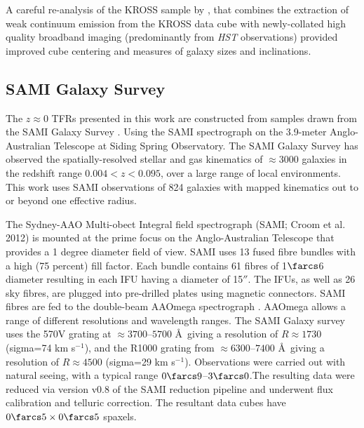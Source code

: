 \documentclass[a4paper,fleqn,usenatbib]{mnras}
\begin{document}
A careful re-analysis of the KROSS sample by \citet{Harrison:2017}, that combines the extraction of weak continuum emission from the KROSS data cube with newly-collated high quality broadband imaging (predominantly from {\it HST} observations) provided improved cube centering and measures of galaxy sizes and inclinations. 

\subsection{SAMI Galaxy Survey}
\label{subsec:SAMIHQ}

The $z\approx0$ TFRs presented in this work are constructed from samples drawn from the SAMI Galaxy Survey  \citep{Bryant:2015}. Using the SAMI spectrograph \citep{Croom:2012} on the 3.9-meter Anglo-Australian Telescope at Siding Spring Observatory. The SAMI Galaxy Survey has observed the spatially-resolved stellar and gas kinematics of $\approx3000$ galaxies in the redshift range $0.004 < z <0.095$, over a large range of local environments. This work uses SAMI observations of 824 galaxies with mapped kinematics out to or beyond one effective radius. 

The Sydney-AAO Multi-obect Integral field spectrograph (SAMI; Croom et al. 2012) is mounted at the prime focus on the Anglo-Australian Telescope that provides a 1 degree diameter field of view. SAMI uses 13 fused fibre bundles \citep[Hexabundles,][]{BlandHawthorn:2011,Bryant:2014} with a high (75 percent) fill factor. Each bundle contains 61 fibres of 1$\farcs$6 diameter resulting in each IFU having a diameter of 15$''$. The IFUs, as well as 26 sky fibres, are plugged into pre-drilled plates using magnetic connectors. SAMI fibres are fed to the double-beam AAOmega spectrograph \citep{Sharp:2015}. AAOmega allows a range of different resolutions and wavelength ranges. The SAMI Galaxy survey uses the 570V grating at $\approx3700$--$5700$ \AA\ giving a resolution of $R\approx1730$ (sigma=74 km s$^{-1}$), and the R1000 grating from $\approx6300$--$7400$ \AA\ giving a resolution of $R\approx4500$ (sigma=29 km s$^{-1}$). Observations were carried out with natural seeing, with a typical range $0\farcs 9$--$3\farcs 0$.The resulting data were reduced via version v0.8 of the SAMI reduction pipeline \citep{Sharp:2015,Allen:2015} and underwent flux calibration and telluric correction. The resultant data cubes have $0\farcs 5 \times 0\farcs 5$ spaxels. 
\end{document}
